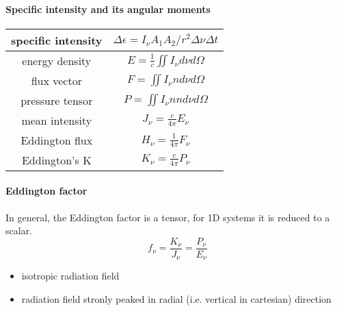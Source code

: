 \documentclass[../main/main.tex]{subfiles}
\begin{document}
\paragraph{Specific intensity and its angular moments}

\begin{center}
\centering
{\tabulinesep=1.5mm
\begin{tabu}{|c|c|}
\hline 
specific intensity & $\Delta \epsilon = \boxed{I_{\nu}} A_1 A_2/r^2 \Delta \nu \Delta t$ \\ \hline
energy density & $E = \frac{1}{c} \iint I_{\nu} d\nu d\Omega$ \\ \hline
flux vector & $F = \iint I_{\nu}n d\nu d\Omega$ \\ \hline
pressure tensor & $P = \iint I_{\nu} nn d\nu d\Omega$ \\ \hline
mean intensity & $J_{\nu} = \frac{c}{4 \pi} E_{\nu}$ \\ \hline
Eddington flux & $H_{\nu} = \frac{1}{4 \pi} F_{\nu}$ \\ \hline
Eddington's K & $K_{\nu} = \frac{c}{4 \pi}P_{\nu}$ \\ \hline
\end{tabu}}
\end{center}

\paragraph{Eddington factor}
In general, the Eddington factor is a tensor, for 1D systems it is reduced to a scalar.
\begin{equation}
f_{\nu} = \frac{K_{\nu}}{J_{\nu}} = \frac{P_{\nu}}{E_{\nu}}
\end{equation}
\begin{itemize}
\item isotropic radiation field
\item radiation field stronly peaked in radial (i.e. vertical in cartesian) direction
\end{itemize}
\end{document}
